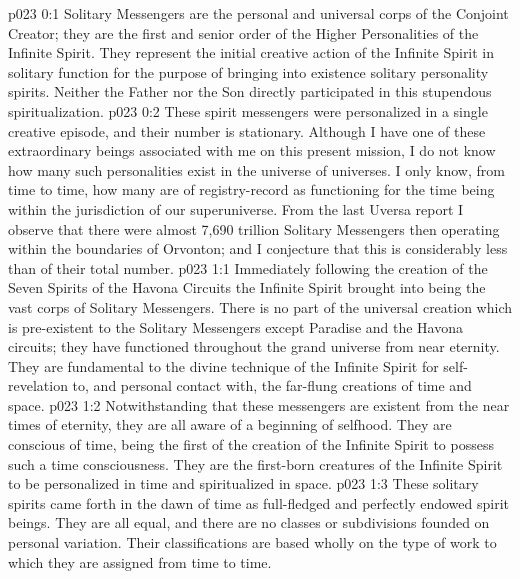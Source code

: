 \author{Divine Counsellor}
\vs p023 0:1 Solitary Messengers are the personal and universal corps of the Conjoint Creator; they are the first and senior order of the Higher Personalities of the Infinite Spirit. They represent the initial creative action of the Infinite Spirit in solitary function for the purpose of bringing into existence solitary personality spirits. Neither the Father nor the Son directly participated in this stupendous spiritualization.
\vs p023 0:2 These spirit messengers were personalized in a single creative episode, and their number is stationary. Although I have one of these extraordinary beings associated with me on this present mission, I do not know how many such personalities exist in the universe of universes. I only know, from time to time, how many are of registry\hyp{}record as functioning for the time being within the jurisdiction of our superuniverse. From the last Uversa report I observe that there were almost 7,690 trillion Solitary Messengers then operating within the boundaries of Orvonton; and I conjecture that this is considerably less than  of their total number.
\vs p023 1:1 Immediately following the creation of the Seven Spirits of the Havona Circuits the Infinite Spirit brought into being the vast corps of Solitary Messengers. There is no part of the universal creation which is pre\hyp{}existent to the Solitary Messengers except Paradise and the Havona circuits; they have functioned throughout the grand universe from near eternity. They are fundamental to the divine technique of the Infinite Spirit for self\hyp{}revelation to, and personal contact with, the far\hyp{}flung creations of time and space.
\vs p023 1:2 Notwithstanding that these messengers are existent from the near times of eternity, they are all aware of a beginning of selfhood. They are conscious of time, being the first of the creation of the Infinite Spirit to possess such a time consciousness. They are the first\hyp{}born creatures of the Infinite Spirit to be personalized in time and spiritualized in space.
\vs p023 1:3 These solitary spirits came forth in the dawn of time as full\hyp{}fledged and perfectly endowed spirit beings. They are all equal, and there are no classes or subdivisions founded on personal variation. Their classifications are based wholly on the type of work to which they are assigned from time to time.
